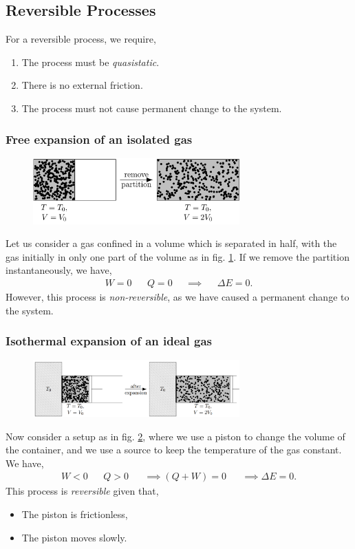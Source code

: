 \documentclass{book}
\begin{document}
\subsection{Reversible Processes}
For a reversible process, we require,
\begin{enumerate}
	\item The process must be \textit{quasistatic}.
	\item There is no external friction.
	\item The process must not cause permanent change to the system.
\end{enumerate}
\subsubsection{Free expansion of an isolated gas}
\begin{figure}
	\centering
	\includegraphics[width=300px]{FreeExpansion.png}
	\caption{} \label{fig:free expansion}
\end{figure}
Let us consider a gas confined in a volume which is separated in half, with the gas initially in only one part of the volume as in fig. \ref{fig:free expansion}. If we remove the partition instantaneously, we have,
\begin{align}
	W = 0 && Q = 0 && \implies && \Delta E = 0.
\end{align}
However, this process is \textit{non-reversible}, as we have caused a permanent change to the system.
\subsubsection{Isothermal expansion of an ideal gas}
\begin{figure}
	\centering
	\includegraphics[width=300px]{Isothermal.png}
	\caption{} \label{fig:isothermal}
\end{figure}
Now consider a setup as in fig. \ref{fig:isothermal}, where we use a piston to change the volume of the container, and we use a source to keep the temperature of the gas constant. We have,
\begin{align}
	W < 0 && Q > 0 && \implies (Q+W) = 0 && \implies \Delta E = 0.
\end{align}
This process is \textit{reversible} given that,
\begin{itemize}
	\item The piston is frictionless,
	\item The piston moves slowly.
\end{itemize}
\end{document}

